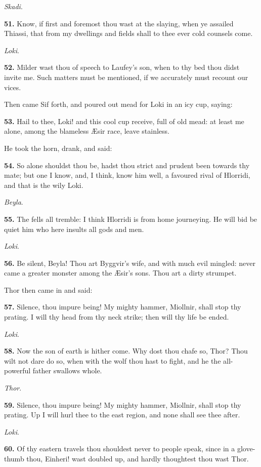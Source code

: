 \emph{Skadi}.

\textbf{51.} Know, if first and foremost thou wast at the slaying, when ye
assailed Thiassi, that from my dwellings and fields shall to thee ever
cold counsels come.

\emph{Loki}.

\textbf{52.} Milder wast thou of speech to Laufey's son, when to thy bed thou
didst invite me. Such matters must be mentioned, if we accurately must
recount our vices.

Then came Sif forth, and poured out mead for Loki in an icy cup,
saying:

\textbf{53.} Hail to thee, Loki! and this cool cup receive, full of old mead:
at least me alone, among the blameless Æsir race, leave stainless.

He took the horn, drank, and said:

\textbf{54.} So alone shouldst thou be, hadst thou strict and prudent been
towards thy mate; but one I know, and, I think, know him well, a
favoured rival of Hlorridi, and that is the wily Loki.

\emph{Beyla}.

\textbf{55.} The fells all tremble: I think Hlorridi is from home journeying.
He will bid be quiet him who here insults all gods and men.

\emph{Loki}.

\textbf{56.} Be silent, Beyla! Thou art Byggvir's wife, and with much evil
mingled: never came a greater monster among the Æsir's sons. Thou art
a dirty strumpet.

Thor then came in and said:

\textbf{57.} Silence, thou impure being! My mighty hammer, Miollnir, shall
stop thy prating. I will thy head from thy neck strike; then will thy
life be ended.

\emph{Loki}.

\textbf{58.} Now the son of earth is hither come. Why dost thou chafe so,
Thor? Thou wilt not dare do so, when with the wolf thou hast to fight,
and he the all-powerful father swallows whole.

\emph{Thor}.

\textbf{59.} Silence, thou impure being! My mighty hammer, Miollnir, shall
stop thy prating. Up I will hurl thee to the east region, and none
shall see thee after.

\emph{Loki}.

\textbf{60.} Of thy eastern travels thou shouldest never to people speak,
since in a glove-thumb thou, Einheri! wast doubled up, and hardly
thoughtest thou wast Thor.

